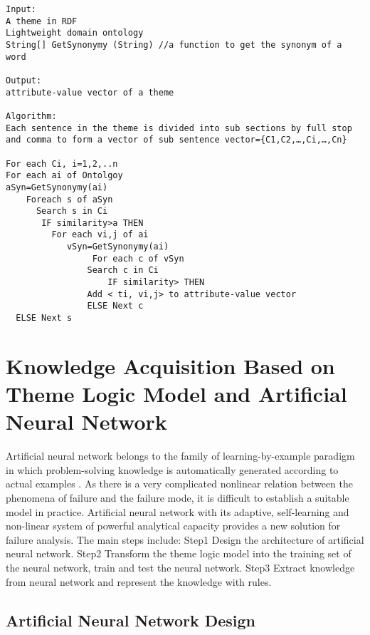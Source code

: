 \documentclass{elsarticle}
\begin{document}
\begin{verbatim}
Input: 
A theme in RDF
Lightweight domain ontology 
String[] GetSynonymy (String) //a function to get the synonym of a word

Output:
attribute-value vector of a theme

Algorithm:
Each sentence in the theme is divided into sub sections by full stop and comma to form a vector of sub sentence vector={C1,C2,…,Ci,…,Cn} 

For each Ci, i=1,2,..n 
For each ai of Ontolgoy 
aSyn=GetSynonymy(ai)
    Foreach s of aSyn
	  Search s in Ci
       IF similarity>a THEN
		 For each vi,j of ai
  			vSyn=GetSynonymy(ai)
    			 For each c of vSyn
				Search c in Ci
        			IF similarity> THEN
				Add < ti, vi,j> to attribute-value vector
			    ELSE Next c
  ELSE Next s

\end{verbatim}

\section{Knowledge Acquisition Based on Theme Logic Model and Artificial Neural Network}
\label{sec:knowl-acqu-based}

Artificial neural network belongs to the family of learning-by-example paradigm in which problem-solving knowledge is automatically generated according to actual examples \cite{hassoun1995fan}. As there is a very complicated nonlinear relation between the phenomena of failure and the failure mode, it is difficult to establish a suitable model in practice. Artificial neural network with its adaptive, self-learning and non-linear system of powerful analytical capacity provides a new solution for failure analysis. The main steps include:
Step1 Design the architecture of artificial neural network.
Step2 Transform the theme logic model into the training set of the neural network, train and test the neural network. 
Step3 Extract knowledge from neural network and represent the
knowledge with rules.

\subsection{Artificial Neural Network Design}
\label{sec:artif-neur-netw}
\end{document}
